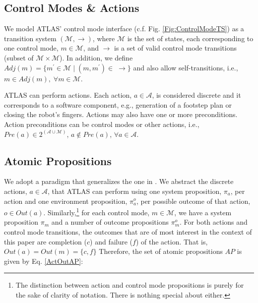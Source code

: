 
\subsection{Control Modes \& Actions}

We model ATLAS' control mode interface (c.f. Fig. \ref{Fig:ControlModeTS}) as a transition system $(\mathcal{M}, \boldsymbol\rightarrow)$, where $\mathcal{M}$ is the set of states, each corresponding to one control mode, $m \in \mathcal{M}$, and $\boldsymbol\rightarrow$ is a set of valid control mode transitions (subset of $\mathcal{M} \times \mathcal{M}$).
In addition, we define $Adj(m) = \{ m^\prime \in \mathcal{M} \; | \; (m, m^\prime) \in \; \boldsymbol\rightarrow \}$ and also allow self-transitions, i.e., $m \in Adj(m), \; \forall m \in \mathcal{M}$.

ATLAS can perform actions. Each action, $a \in \mathcal{A}$, is considered discrete and it corresponds to a software component, e.g., generation of a footstep plan or closing the robot's fingers.
Actions may also have one or more preconditions.
Action preconditions can be control modes or other actions, i.e., $Pre(a) \in 2^{(\mathcal{A} \cup \mathcal{M})}$, $a \not \in Pre(a)$, $\forall a \in \mathcal{A}$.

\subsection{Atomic Propositions}


We adopt a paradigm that generalizes the one in \cite{Vasu2013ICRA}.
We abstract the discrete actions, $a \in \mathcal{A}$, that ATLAS can perform using one system proposition, $\pi_a$, per action and one environment proposition, $\pi_a^o$, per possible outcome of that action, $o \in Out(a)$.
Similarly,\footnote{The distinction between action and control mode propositions is purely for the sake of clarity of notation. There is nothing special about either.}
for each control mode, $m \in \mathcal{M}$, we have a system proposition $\pi_m$ and a number of outcome propositions $\pi_m^o$.
For both actions and control mode transitions, the outcomes that are of most interest in the context of this paper are completion ($c$) and failure ($f$) of the action. That is, $Out(a) = Out(m) = \{ c, f \}$
Therefore, the set of atomic propositions $AP$ is given by Eq. \eqref{ActOutAP}:

